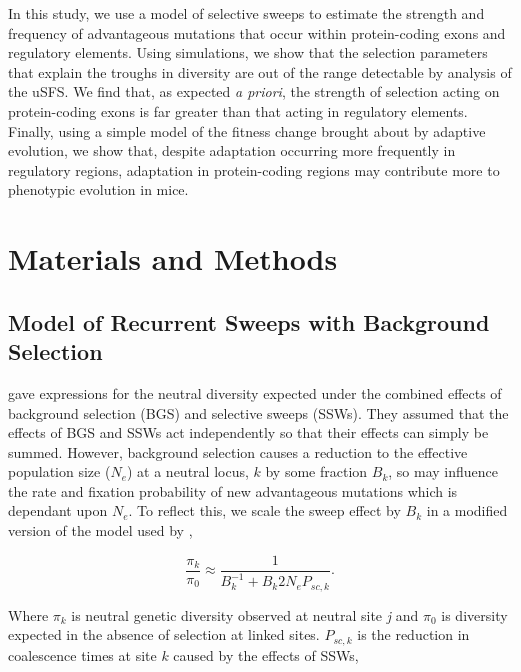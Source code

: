 \documentclass[11pt]{article}
\begin{document}
In this study, we use a model of selective sweeps to estimate the strength and frequency of advantageous mutations that occur within protein-coding exons and regulatory elements. Using simulations, we show that the selection parameters that explain the troughs in diversity are out of the range detectable by analysis of the uSFS.  We find that, as expected \textit{a priori}, the strength of selection acting on protein-coding exons is far greater than that acting in regulatory elements. Finally, using a simple model of the fitness change brought about by adaptive evolution, we show that, despite adaptation occurring more frequently in regulatory regions, adaptation in protein-coding regions may contribute more to phenotypic evolution in mice.

%
%
\section*{Materials and Methods}

\subsection*{Model of Recurrent Sweeps with Background Selection}

	\cite{RN290} gave expressions for the neutral diversity expected under the combined effects of background selection (BGS) and selective sweeps (SSWs). They assumed that the effects of BGS and SSWs act independently so that their effects can simply be summed. However, background selection causes a reduction to the effective population size ($N_e$) at a neutral locus, $k$ by some fraction $B_k$, so may influence the rate and fixation probability of new advantageous mutations which is dependant upon $N_e$. To reflect this, we scale the sweep effect by $B_k$ in a modified version of the model used by \cite{RN290},
	
\begin{equation}
\label{jointApprox}
\frac{\pi_{k}}{\pi_{0}} \approx  \frac{1}{B_{k}^{-1}  + B_{k}2N_eP_{sc,k}}.
\end{equation}

	Where $\pi_k$ is neutral genetic diversity observed at neutral site \textit{j} and $\pi_0$ is diversity expected in the absence of selection at linked sites. $P_{sc,k}$ is the reduction in coalescence times at site $k$ caused by the effects of SSWs,
\end{document}
